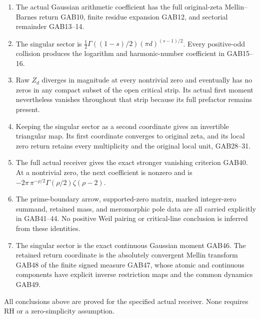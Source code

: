 \documentclass[
  10pt,
  a4paper,
]{article}
\providecommand{\tightlist}{%
  \setlength{\itemsep}{0pt}\setlength{\parskip}{0pt}}
\begin{document}
\begin{enumerate}
\def\labelenumi{\arabic{enumi}.}
\tightlist
\item
  The actual Gaussian arithmetic coefficient has the full original-zeta
  Mellin--Barnes return GAB10, finite residue expansion GAB12, and
  sectorial remainder GAB13--14.
\item
  The singular sector is \(\frac12\Gamma((1-s)/2)(\pi d)^{(s-1)/2}\).
  Every positive-odd collision produces the logarithm and
  harmonic-number coefficient in GAB15--16.
\item
  Raw \(Z_d\) diverges in magnitude at every nontrivial zero and
  eventually has no zeros in any compact subset of the open critical
  strip. Its actual first moment nevertheless vanishes throughout that
  strip because its full prefactor remains present.
\item
  Keeping the singular sector as a second coordinate gives an invertible
  triangular map. Its first coordinate converges to original zeta, and
  its local zero return retains every multiplicity and the original
  local unit, GAB28--31.
\item
  The full actual receiver gives the exact stronger vanishing criterion
  GAB40. At a nontrivial zero, the next coefficient is nonzero and is
  \(-2\pi\,\pi^{-\rho/2}\Gamma(\rho/2)\zeta(\rho-2)\).
\item
  The prime-boundary arrow, supported-zero matrix, marked integer-zero
  summand, retained mass, and meromorphic pole data are all carried
  explicitly in GAB41--44. No positive Weil pairing or critical-line
  conclusion is inferred from these identities.
\item
  The singular sector is the exact continuous Gaussian moment GAB46. The
  retained return coordinate is the absolutely convergent Mellin
  transform GAB48 of the finite signed measure GAB47, whose atomic and
  continuous components have explicit inverse restriction maps and the
  common dynamics GAB49.
\end{enumerate}

All conclusions above are proved for the specified actual receiver. None
requires RH or a zero-simplicity assumption.
\end{document}

